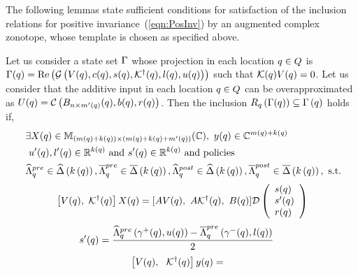 The following lemmas state sufficient conditions for satisfaction of
the inclusion relations for positive invariance~(\ref{eqn:PosInv}) by
an augmented complex zonotope, whose template is chosen as specified
above.
\begin{lemma}
  Let us consider a state set $\Gamma$ whose projection in each
  location $q\in Q$ is $\Gamma(q) =
  \operatorname{\operatorname{Re}}\left(\mathcal{G}\left(V(q),c(q),s(q),\mathcal{K}^\dagger(q),l(q),u(q)\right)\right)$
  such that $\mathcal{K}(q)V(q) = 0$.  Let us consider that the
  additive input in each location $q\in Q$ can be
  overapproximated as $U(q) = \mathcal{C}\left(B_{n\times
      m^\prime(q)}(q),b(q),r(q)\right)$.  Then the inclusion
  $R_{q}\left(\Gamma(q)\right) \subseteq
  \Gamma\left(q\right)$ holds if,
\begin{align}
\begin{split}~\label{eqn:exists-intra}
& \exists
  X(q)\in\mathbb{M}_{\left(m(q)+k(q)\right)\times \left(m(q)+k(q)+m^\prime(q)\right)}(\mathbb{\mathbb{C}}),~
  y(q)\in\mathbb{C}^{m(q)+k(q)}\\&~u^\prime(q),l^\prime(q)\in\mathbb{R}^{k(q)}~\text{and}~s^\prime(q)\in\mathbb{R}^{k(q)}~\text{and policies}\\
&\widehat{\Lambda}_{q}^{pre}\in\widehat{\Delta}\left(k\left(q\right)\right),\overline{\Lambda}_{q}^{pre}\in\overline{\Delta}\left(k\left(q\right)\right),
\widehat{\Lambda}_{q}^{post}\in\widehat{\Delta}\left(k\left(q\right)\right),\overline{\Lambda}_{q}^{post}\in\overline{\Delta}\left(k\left(q\right)\right),~\text{s.t.}
\end{split}
\end{align}
\begin{align}
\begin{split}
& \left[V(q),~\mathcal{K}^\dagger(q)\right]X(q) =
  [AV(q),~A\mathcal{K}^\dagger(q),~B(q)]\mathcal{D}\left(\begin{array}{l}s(q)\\s^\prime(q)\\r(q)\end{array}\right)\\
\end{split}
\end{align}
\begin{align}
\begin{split}
& s^\prime(q) = \frac{\widehat{\Lambda}_{q}^{pre}\left(\gamma^+(q),u(q)\right)
      -\overline{\Lambda}_{q}^{pre}\left(\gamma^-(q),l(q)\right)}{2}
\end{split}
\end{align}
\begin{align}
\begin{split}
  & \left[V(\loc),~~\pinv{\ptemplate}(\loc)\rt]y(\loc) = 

\end{split}
\end{align}
\end{lemma}
